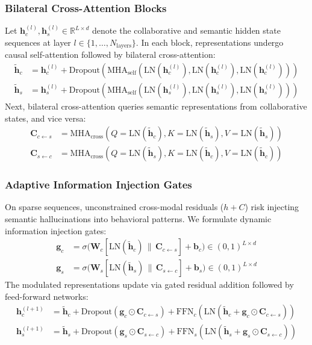 \subsubsection{Bilateral Cross-Attention Blocks}
Let $\mathbf{h}_c^{(l)}, \mathbf{h}_s^{(l)} \in \mathbb{R}^{L \times d}$ denote the collaborative and semantic hidden state sequences at layer $l \in \{1, \dots, N_{\text{layers}}\}$. In each block, representations undergo causal self-attention followed by bilateral cross-attention:
\begin{align}
    \tilde{\mathbf{h}}_c &= \mathbf{h}_c^{(l)} + \text{Dropout}(\text{MHA}_{\text{self}}(\text{LN}(\mathbf{h}_c^{(l)}), \text{LN}(\mathbf{h}_c^{(l)}), \text{LN}(\mathbf{h}_c^{(l)}))) \\
    \tilde{\mathbf{h}}_s &= \mathbf{h}_s^{(l)} + \text{Dropout}(\text{MHA}_{\text{self}}(\text{LN}(\mathbf{h}_s^{(l)}), \text{LN}(\mathbf{h}_s^{(l)}), \text{LN}(\mathbf{h}_s^{(l)})))
\end{align}
Next, bilateral cross-attention queries semantic representations from collaborative states, and vice versa:
\begin{align}
    \mathbf{C}_{c \leftarrow s} &= \text{MHA}_{\text{cross}}(Q = \text{LN}(\tilde{\mathbf{h}}_c), K = \text{LN}(\tilde{\mathbf{h}}_s), V = \text{LN}(\tilde{\mathbf{h}}_s)) \\
    \mathbf{C}_{s \leftarrow c} &= \text{MHA}_{\text{cross}}(Q = \text{LN}(\tilde{\mathbf{h}}_s), K = \text{LN}(\tilde{\mathbf{h}}_c), V = \text{LN}(\tilde{\mathbf{h}}_c))
\end{align}

\subsubsection{Adaptive Information Injection Gates}
On sparse sequences, unconstrained cross-modal residuals ($h + C$) risk injecting semantic hallucinations into behavioral patterns. We formulate dynamic information injection gates:
\begin{align}
    \mathbf{g}_c &= \sigma\big(\mathbf{W}_c [\text{LN}(\tilde{\mathbf{h}}_c) \,\|\, \mathbf{C}_{c \leftarrow s}] + \mathbf{b}_c\big) \in (0, 1)^{L \times d} \\
    \mathbf{g}_s &= \sigma\big(\mathbf{W}_s [\text{LN}(\tilde{\mathbf{h}}_s) \,\|\, \mathbf{C}_{s \leftarrow c}] + \mathbf{b}_s\big) \in (0, 1)^{L \times d}
\end{align}
The modulated representations update via gated residual addition followed by feed-forward networks:
\begin{align}
    \mathbf{h}_c^{(l+1)} &= \tilde{\mathbf{h}}_c + \text{Dropout}(\mathbf{g}_c \odot \mathbf{C}_{c \leftarrow s}) + \text{FFN}_c(\text{LN}(\tilde{\mathbf{h}}_c + \mathbf{g}_c \odot \mathbf{C}_{c \leftarrow s})) \\
    \mathbf{h}_s^{(l+1)} &= \tilde{\mathbf{h}}_s + \text{Dropout}(\mathbf{g}_s \odot \mathbf{C}_{s \leftarrow c}) + \text{FFN}_s(\text{LN}(\tilde{\mathbf{h}}_s + \mathbf{g}_s \odot \mathbf{C}_{s \leftarrow c}))
\end{align}

